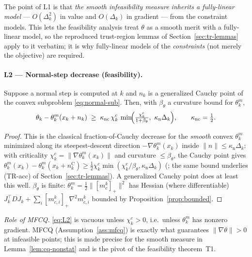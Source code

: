 \noindent The point of L1 is that \emph{the smooth infeasibility measure inherits a
fully-linear model} --- $O(\Delta_k^2)$ in value and $O(\Delta_k)$ in gradient ---
from the constraint models. This lets the feasibility analysis treat $\theta$ as a
smooth merit with a fully-linear model, so the reproduced trust-region lemmas of
Section~\ref{sec:tr-lemmas} apply to it verbatim; it is why fully-linear models of
the \emph{constraints} (not merely the objective) are required.

\paragraph{L2 --- Normal-step decrease (feasibility).}

\begin{lemma}[L2]
  \label{lem:L2}
  Suppose a normal step is computed at $k$ and $n_k$ is a generalized Cauchy point of
  the convex subproblem \eqref{eq:normal-sub}. Then, with $\beta_\theta$ a curvature
  bound for $\theta_k^m$,
  \begin{equation}
    \label{eq:L2}
    \theta_k - \theta_k^m(x_k+n_k)
      \;\ge\; \kappa_{\mathrm{nc}}\,\chi_k^c\,
              \min\!\Bigl(\tfrac{\chi_k^c}{1+\beta_\theta},\ \kappa_{\mathrm n}\Delta_k\Bigr),
    \qquad \kappa_{\mathrm{nc}}=\tfrac12 .
  \end{equation}
\end{lemma}
\begin{proof}
  This is the classical fraction-of-Cauchy decrease for the \emph{smooth} convex
  $\theta_k^m$ minimized along its steepest-descent direction $-\nabla\theta_k^m(x_k)$
  inside $\|n\|\le\kappa_{\mathrm n}\Delta_k$: with criticality
  $\chi_k^c=\|\nabla\theta_k^m(x_k)\|$ and curvature $\le\beta_\theta$, the Cauchy
  point gives $\theta_k^m(x_k)-\theta_k^m(x_k+n_k^{\mathrm C})\ge\tfrac12\chi_k^c\min(\chi_k^c/\beta_\theta,\kappa_{\mathrm n}\Delta_k)$
  (\citealp[Ch.~6.3]{ConnGouldToint2000}; the same bound underlies (TR-acc) of
  Section~\ref{sec:tr-lemmas}). A generalized Cauchy point does at least this well.
  $\beta_\theta$ is finite: $\theta_k^m=\tfrac12\|[m_c^k]_+\|^2$ has Hessian (where
  differentiable) $J_k^\top D J_k+\sum_i[m_{c,i}^k]_+\nabla^2 m_{c,i}^k$ bounded by
  Proposition~\ref{prop:bounded}.
\end{proof}

\noindent \emph{Role of MFCQ.} \eqref{eq:L2} is vacuous unless $\chi_k^c>0$, i.e.\
unless $\theta_k^m$ has nonzero gradient. MFCQ (Assumption~\ref{ass:mfcq}) is exactly
what guarantees $\|\nabla\theta\|>0$ at infeasible points; this is made precise for the
smooth measure in Lemma~\ref{lem:cq-nonstat} and is the pivot of the feasibility
theorem~T1.


